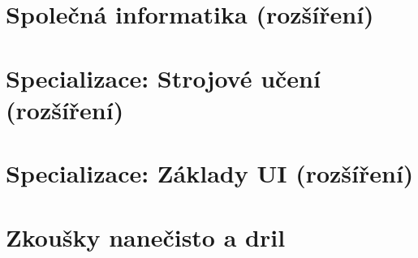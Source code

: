 \documentclass[11pt]{article}
\begin{document}
\section{Společná informatika \textnormal{\normalsize(rozšíření)}}





\section{Specializace: Strojové učení \textnormal{\normalsize(rozšíření)}}


\section{Specializace: Základy UI \textnormal{\normalsize(rozšíření)}}




\section{Zkoušky nanečisto a dril}



\end{document}
